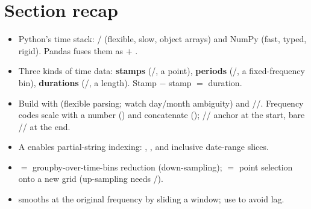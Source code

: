 \documentclass[11pt]{article}
\begin{document}
\section*{Section recap}
\begin{itemize}
  \item Python's time stack: / (flexible, slow, object arrays) and NumPy  (fast, typed, rigid). Pandas fuses them as  $+$ .
  \item Three kinds of time data: \textbf{stamps} (/, a point), \textbf{periods} (/, a fixed-frequency bin), \textbf{durations} (/, a length). Stamp $-$ stamp $=$ duration.
  \item Build with  (flexible parsing; watch day/month ambiguity) and //. Frequency codes scale with a number () and concatenate (); // anchor at the start, bare // at the end.
  \item A  enables partial-string indexing: , , and inclusive date-range slices.
  \item {} $=$ groupby-over-time-bins reduction (down-sampling);  $=$ point selection onto a new grid (up-sampling needs /).
  \item {} smooths at the original frequency by sliding a window; use  to avoid lag.
\end{itemize}
\end{document}
